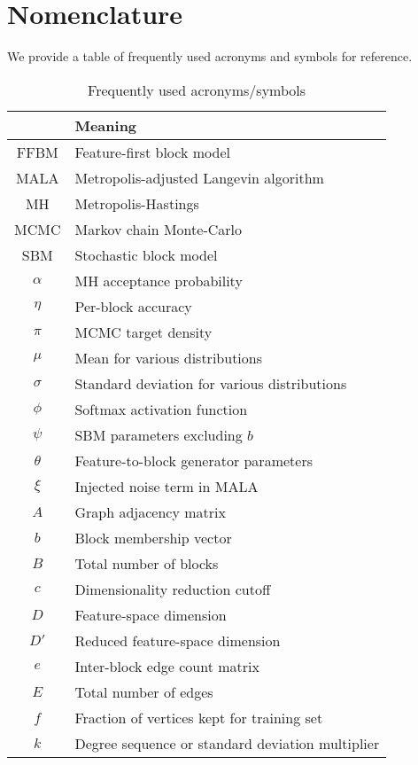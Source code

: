 \section*{Nomenclature}

We provide a table of frequently used acronyms and symbols for reference.

\begin{table}[!h]
	\centering
	\caption{Frequently used acronyms/symbols}
	\label{tab:symbols}
	\begin{tabular}{c|l}
			  & \textbf{Meaning} \\ \hline
			  FFBM & Feature-first block model \\
			  MALA & Metropolis-adjusted Langevin algorithm \\
			  MH & Metropolis-Hastings \\
			  MCMC & Markov chain Monte-Carlo \\
			  SBM & Stochastic block model \\
			  $\alpha$ & MH acceptance probability\\
			  $\eta$ & Per-block accuracy \\
			  $\pi$ & MCMC target density \\
			  $\mu$ & Mean for various distributions \\
			  $\sigma$ & Standard deviation for various distributions \\
			  $\phi$ & Softmax activation function \\
			  $\psi$ & SBM parameters excluding $b$ \\
			  $\theta$ & Feature-to-block generator parameters \\
			  $\xi$ & Injected noise term in MALA\\
			  $A$ & Graph adjacency matrix \\
			  $b$ & Block membership vector\\
			  $B$ & Total number of blocks \\
			  $c$ & Dimensionality reduction cutoff \\
			  $D$ & Feature-space dimension \\
			  $D'$ & Reduced feature-space dimension \\
			  $e$ & Inter-block edge count matrix \\
			  $E$ & Total number of edges \\
			  $f$ & Fraction of vertices kept for training set\\
			  $k$ & Degree sequence or standard deviation multiplier\\

\end{tabular}
\end{table}
